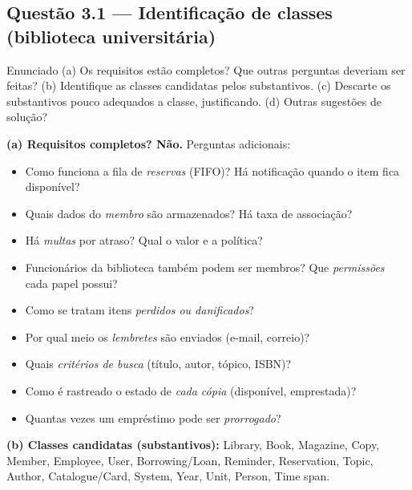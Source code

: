 \documentclass[11pt,a4paper]{article}
\begin{document}
\subsection*{Questão 3.1 — Identificação de classes (biblioteca universitária)}
\begin{questao}{Enunciado}
(a) Os requisitos estão completos? Que outras perguntas deveriam ser feitas?
(b) Identifique as classes candidatas pelos substantivos. (c) Descarte os
substantivos pouco adequados a classe, justificando. (d) Outras sugestões de
solução?
\end{questao}
\begin{resposta}
\textbf{(a) Requisitos completos? Não.} Perguntas adicionais:
\begin{itemize}[nosep]
  \item Como funciona a fila de \emph{reservas} (FIFO)? Há notificação quando o
        item fica disponível?
  \item Quais dados do \emph{membro} são armazenados? Há taxa de associação?
  \item Há \emph{multas} por atraso? Qual o valor e a política?
  \item Funcionários da biblioteca também podem ser membros? Que
        \emph{permissões} cada papel possui?
  \item Como se tratam itens \emph{perdidos ou danificados}?
  \item Por qual meio os \emph{lembretes} são enviados (e-mail, correio)?
  \item Quais \emph{critérios de busca} (título, autor, tópico, ISBN)?
  \item Como é rastreado o estado de \emph{cada cópia} (disponível, emprestada)?
  \item Quantas vezes um empréstimo pode ser \emph{prorrogado}?
\end{itemize}

\textbf{(b) Classes candidatas (substantivos):} Library, Book, Magazine, Copy,
Member, Employee, User, Borrowing/Loan, Reminder, Reservation, Topic, Author,
Catalogue/Card, System, Year, Unit, Person, Time span.


\end{resposta}
\end{document}
